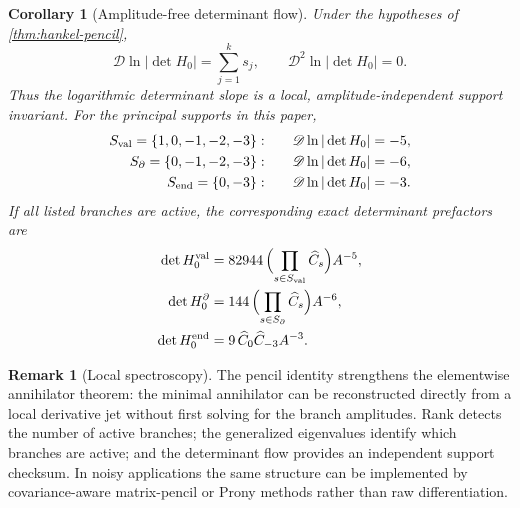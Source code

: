 \documentclass[aps,prd,reprint,onecolumn,nofootinbib,superscriptaddress,showkeys]{revtex4-2}
\numberwithin{equation}{section}
\theoremstyle{definition}
\newtheorem{remark}{Remark}[section]
\theoremstyle{plain}
\newtheorem{corollary}{Corollary}[section]
\newcommand{\Dil}{\mathscr D}
\begin{document}
\begin{corollary}[Amplitude-free determinant flow]\label{cor:det-flow}
Under the hypotheses of \cref{thm:hankel-pencil},
\begin{equation}
\boxed{
\Dil\ln|\det H_0|
=
\sum_{j=1}^{k}s_j,
\qquad
\Dil^2\ln|\det H_0|=0.
}
\end{equation}
Thus the logarithmic determinant slope is a local, amplitude-independent support invariant.  For the principal supports in this paper,
\begin{align}
S_{\rm val}=\{1,0,-1,-2,-3\}:&\qquad
\Dil\ln|\det H_0|=-5,
\\
S_{\partial}=\{0,-1,-2,-3\}:&\qquad
\Dil\ln|\det H_0|=-6,
\\
S_{\rm end}=\{0,-3\}:&\qquad
\Dil\ln|\det H_0|=-3.
\end{align}
If all listed branches are active, the corresponding exact determinant prefactors are
\begin{align}
\det H_0^{\rm val}
&=82944\,\Bigl(\prod_{s\in S_{\rm val}}\widehat C_s\Bigr)A^{-5},\\
\det H_0^{\partial}
&=144\,\Bigl(\prod_{s\in S_\partial}\widehat C_s\Bigr)A^{-6},\\
\det H_0^{\rm end}
&=9\,\widehat C_0\widehat C_{-3}A^{-3}.
\end{align}
\end{corollary}

\begin{remark}[Local spectroscopy]
The pencil identity strengthens the elementwise annihilator theorem: the minimal annihilator can be reconstructed directly from a local derivative jet without first solving for the branch amplitudes.  Rank detects the number of active branches; the generalized eigenvalues identify which branches are active; and the determinant flow provides an independent support checksum.  In noisy applications the same structure can be implemented by covariance-aware matrix-pencil or Prony methods rather than raw differentiation.
\end{remark}
\end{document}

